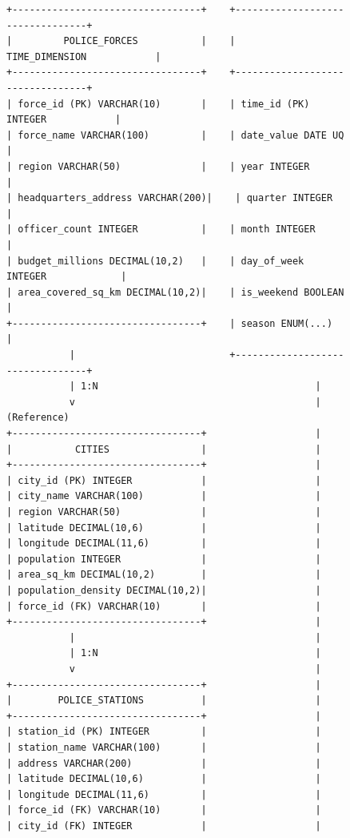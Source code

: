 \documentclass[12pt,a4paper]{article}
\begin{document}
\begin{figure}[h]
\centering
\begin{verbatim}
+---------------------------------+    +---------------------------------+
|         POLICE_FORCES           |    |       TIME_DIMENSION            |
+---------------------------------+    +---------------------------------+
| force_id (PK) VARCHAR(10)       |    | time_id (PK) INTEGER            |
| force_name VARCHAR(100)         |    | date_value DATE UQ              |
| region VARCHAR(50)              |    | year INTEGER                    |
| headquarters_address VARCHAR(200)|    | quarter INTEGER                 |
| officer_count INTEGER           |    | month INTEGER                   |
| budget_millions DECIMAL(10,2)   |    | day_of_week INTEGER             |
| area_covered_sq_km DECIMAL(10,2)|    | is_weekend BOOLEAN              |
+---------------------------------+    | season ENUM(...)                |
           |                           +---------------------------------+
           | 1:N                                      |
           v                                          | (Reference)
+---------------------------------+                   |
|           CITIES                |                   |
+---------------------------------+                   |
| city_id (PK) INTEGER            |                   |
| city_name VARCHAR(100)          |                   |
| region VARCHAR(50)              |                   |
| latitude DECIMAL(10,6)          |                   |
| longitude DECIMAL(11,6)         |                   |
| population INTEGER              |                   |
| area_sq_km DECIMAL(10,2)        |                   |
| population_density DECIMAL(10,2)|                   |
| force_id (FK) VARCHAR(10)       |                   |
+---------------------------------+                   |
           |                                          |
           | 1:N                                      |
           v                                          |
+---------------------------------+                   |
|        POLICE_STATIONS          |                   |
+---------------------------------+                   |
| station_id (PK) INTEGER         |                   |
| station_name VARCHAR(100)       |                   |
| address VARCHAR(200)            |                   |
| latitude DECIMAL(10,6)          |                   |
| longitude DECIMAL(11,6)         |                   |
| force_id (FK) VARCHAR(10)       |                   |
| city_id (FK) INTEGER            |                   |

\end{verbatim}
\end{figure}
\end{document}

